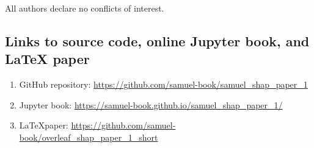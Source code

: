 All authors declare no conflicts of interest.

\subsection*{Links to source code, online Jupyter book, and LaTeX paper}
\begin{enumerate}
    \item GitHub repository: \url{https://github.com/samuel-book/samuel_shap_paper_1} \cite{samuel_paper_1_github}
    \item Jupyter book: \url{https://samuel-book.github.io/samuel_shap_paper_1/}
    \item \LaTeX paper: \url{https://github.com/samuel-book/overleaf_shap_paper_1_short}
\end{enumerate}
